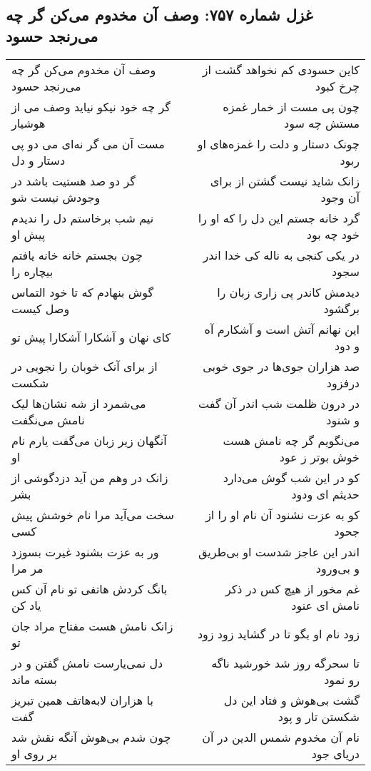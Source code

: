\begin{center}
\section*{غزل شماره ۷۵۷: وصف آن مخدوم می‌کن گر چه می‌رنجد حسود}
\label{sec:0757}
\begin{longtable}{l p{0.5cm} r}
وصف آن مخدوم می‌کن گر چه می‌رنجد حسود
&&
کاین حسودی کم نخواهد گشت از چرخ کبود
\\
گر چه خود نیکو نیاید وصف می از هوشیار
&&
چون پی مست از خمار غمزه مستش چه سود
\\
مست آن می گر نه‌ای می دو پی دستار و دل
&&
چونک دستار و دلت را غمزه‌های او ربود
\\
گر دو صد هستیت باشد در وجودش نیست شو
&&
زانک شاید نیست گشتن از برای آن وجود
\\
نیم شب برخاستم دل را ندیدم پیش او
&&
گرد خانه جستم این دل را که او را خود چه بود
\\
چون بجستم خانه خانه یافتم بیچاره را
&&
در یکی کنجی به ناله کی خدا اندر سجود
\\
گوش بنهادم که تا خود التماس وصل کیست
&&
دیدمش کاندر پی زاری زبان را برگشود
\\
کای نهان و آشکارا آشکارا پیش تو
&&
این نهانم آتش است و آشکارم آه و دود
\\
از برای آنک خوبان را نجویی در شکست
&&
صد هزاران جوی‌ها در جوی خوبی درفزود
\\
می‌شمرد از شه نشان‌ها لیک نامش می‌نگفت
&&
در درون ظلمت شب اندر آن گفت و شنود
\\
آنگهان زیر زبان می‌گفت یارم نام او
&&
می‌نگویم گر چه نامش هست خوش بوتر ز عود
\\
زانک در وهم من آید دزدگوشی از بشر
&&
کو در این شب گوش می‌دارد حدیثم ای ودود
\\
سخت می‌آید مرا نام خوشش پیش کسی
&&
کو به عزت نشنود آن نام او را از جحود
\\
ور به عزت بشنود غیرت بسوزد مر مرا
&&
اندر این عاجز شدست او بی‌طریق و بی‌ورود
\\
بانگ کردش هاتفی تو نام آن کس یاد کن
&&
غم مخور از هیچ کس در ذکر نامش ای عنود
\\
زانک نامش هست مفتاح مراد جان تو
&&
زود نام او بگو تا در گشاید زود زود
\\
دل نمی‌یارست نامش گفتن و در بسته ماند
&&
تا سحرگه روز شد خورشید ناگه رو نمود
\\
با هزاران لابه‌هاتف همین تبریز گفت
&&
گشت بی‌هوش و فتاد این دل شکستن تار و پود
\\
چون شدم بی‌هوش آنگه نقش شد بر روی او
&&
نام آن مخدوم شمس الدین در آن دریای جود
\\
\end{longtable}
\end{center}
